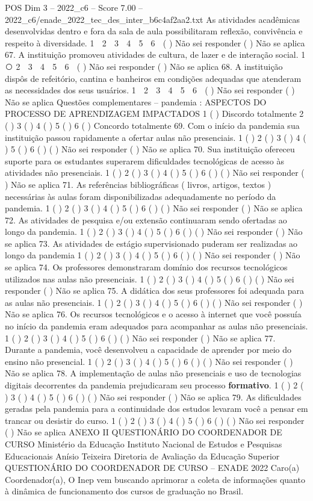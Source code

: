 \begin{textsample}{POS Dim 3 – 2022\_c6 – Score 7.00 – 2022\_c6/enade\_2022\_tec\_des\_inter\_b6c4af2aa2.txt}
As atividades acadêmicas desenvolvidas dentro e fora da sala de aula possibilitaram reflexão, convivência e respeito à diversidade. 1 ⃝ 2 ⃝ 3 ⃝ 4 ⃝ 5 ⃝ 6 ⃝ ( ) Não sei responder ( ) Não se aplica 67.
A instituição promoveu atividades de cultura, de lazer e de interação social. 1 ⃝ 2 ⃝ 3 ⃝ 4 ⃝ 5 ⃝ 6 ⃝ ( ) Não sei responder ( ) Não se aplica 68.
A instituição dispôs de refeitório, cantina e banheiros em condições adequadas que atenderam as necessidades dos seus usuários. 1 ⃝ 2 ⃝ 3 ⃝ 4 ⃝ 5 ⃝ 6 ⃝ ( ) Não sei responder ( ) Não se aplica Questões complementares – pandemia : ASPECTOS DO PROCESSO DE APRENDIZAGEM IMPACTADOS 1 ( ) Discordo totalmente 2 ( ) 3 ( ) 4 ( ) 5 ( ) 6 ( ) Concordo totalmente 69.
Com o início da pandemia sua instituição passou rapidamente a ofertar aulas não presenciais. 1 ( ) 2 ( ) 3 ( ) 4 ( ) 5 ( ) 6 ( ) ( ) Não sei responder ( ) Não se aplica 70.
Sua instituição ofereceu suporte para os estudantes superarem dificuldades tecnológicas de acesso às atividades não presenciais. 1 ( ) 2 ( ) 3 ( ) 4 ( ) 5 ( ) 6 ( ) ( ) Não sei responder ( ) Não se aplica 71.
As referências bibliográficas ( livros, artigos, textos ) necessárias às aulas foram disponibilizadas adequadamente no período da pandemia. 1 ( ) 2 ( ) 3 ( ) 4 ( ) 5 ( ) 6 ( ) ( ) Não sei responder ( ) Não se aplica 72.
As atividades de pesquisa e/ou extensão continuaram sendo ofertadas ao longo da pandemia. 1 ( ) 2 ( ) 3 ( ) 4 ( ) 5 ( ) 6 ( ) ( ) Não sei responder ( ) Não se aplica 73.
As atividades de estágio supervisionado puderam ser realizadas ao longo da pandemia 1 ( ) 2 ( ) 3 ( ) 4 ( ) 5 ( ) 6 ( ) ( ) Não sei responder ( ) Não se aplica 74.
Os professores demonstraram domínio dos recursos tecnológicos utilizados nas aulas não presenciais. 1 ( ) 2 ( ) 3 ( ) 4 ( ) 5 ( ) 6 ( ) ( ) Não sei responder ( ) Não se aplica 75.
A didática dos seus professores foi adequada para as aulas não presenciais. 1 ( ) 2 ( ) 3 ( ) 4 ( ) 5 ( ) 6 ( ) ( ) Não sei responder ( ) Não se aplica 76.
Os recursos tecnológicos e o acesso à internet que você possuía no início da pandemia eram adequados para acompanhar as aulas não presenciais. 1 ( ) 2 ( ) 3 ( ) 4 ( ) 5 ( ) 6 ( ) ( ) Não sei responder ( ) Não se aplica 77.
Durante a pandemia, você desenvolveu a capacidade de aprender por meio do ensino não presencial. 1 ( ) 2 ( ) 3 ( ) 4 ( ) 5 ( ) 6 ( ) ( ) Não sei responder ( ) Não se aplica 78.
A implementação de aulas não presenciais e uso de tecnologias digitais decorrentes da pandemia prejudicaram seu processo \textbf{formativo}. 1 ( ) 2 ( ) 3 ( ) 4 ( ) 5 ( ) 6 ( ) ( ) Não sei responder ( ) Não se aplica 79.
As dificuldades geradas pela pandemia para a continuidade dos estudos levaram você a pensar em trancar ou desistir do curso. 1 ( ) 2 ( ) 3 ( ) 4 ( ) 5 ( ) 6 ( ) ( ) Não sei responder ( ) Não se aplica ANEXO II QUESTIONÁRIO DO COORDENADOR DE CURSO Ministério da Educação Instituto Nacional de Estudos e Pesquisas Educacionais Anísio Teixeira Diretoria de Avaliação da Educação Superior QUESTIONÁRIO DO COORDENADOR DE CURSO – ENADE 2022 Caro(a) Coordenador(a), O Inep vem buscando aprimorar a coleta de informações quanto à dinâmica de funcionamento dos cursos de graduação no Brasil.

\end{textsample}
